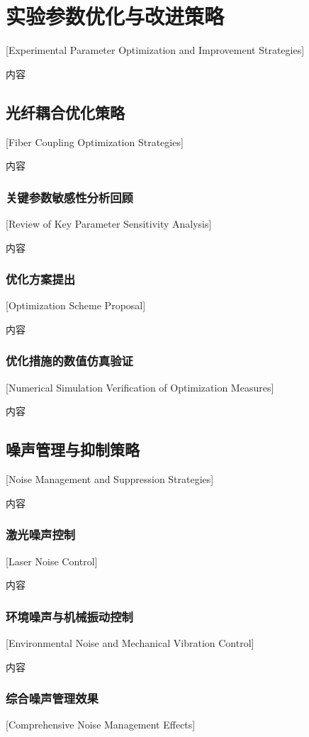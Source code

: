 \chapter{实验参数优化与改进策略}[Experimental Parameter Optimization and Improvement Strategies]

内容

\section{光纤耦合优化策略}[Fiber Coupling Optimization Strategies]

内容

\subsection{关键参数敏感性分析回顾}[Review of Key Parameter Sensitivity Analysis]

内容

\subsection{优化方案提出}[Optimization Scheme Proposal]

内容

\subsection{优化措施的数值仿真验证}[Numerical Simulation Verification of Optimization Measures]

内容

\section{噪声管理与抑制策略}[Noise Management and Suppression Strategies]

内容

\subsection{激光噪声控制}[Laser Noise Control]

内容

\subsection{环境噪声与机械振动控制}[Environmental Noise and Mechanical Vibration Control]

内容

\subsection{综合噪声管理效果}[Comprehensive Noise Management Effects]

